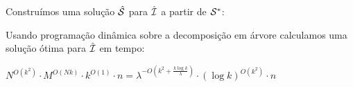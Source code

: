\begin{frame}{}
    \centering
    Construímos uma solução {\color{red} $\hat {\mathcal{S}}$} para $\hat {\mathcal{I}}$ a partir de {\color{blue} $\mathcal{S}^*$}:

    \begin{minipage}{\linewidth}
        \vspace*{2cm}
        \centering
    \end{minipage}
\end{frame}

\begin{frame}{}
    Usando programação dinâmica sobre a decomposição em árvore calculamos uma solução ótima para $\hat{\mathcal{I}}$ em tempo:

    \bigskip
    \centering
    $N^{O(k^2)}\cdot M^{O(Nk)}\cdot k^{O(1)} \cdot n = \lambda^{-O(k^2+\frac{k\log k}{\lambda})}\cdot (\log k)^{O(k^2)}\cdot n$
\end{frame}

